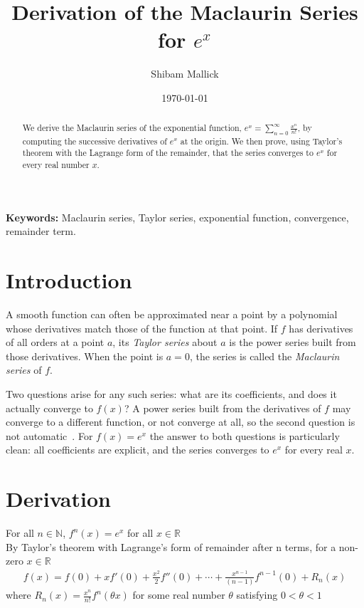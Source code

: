 \documentclass[12pt,a4paper]{article}
\title{Derivation of the Maclaurin Series for $e^x$}
\author{Shibam Mallick}
\date{\today}
\begin{document}
\maketitle

\begin{abstract}
     We derive the Maclaurin series of the exponential function, $e^x=\displaystyle{\sum_{n=0}^{\infty}\frac{x^n}{n!}}$, by computing the successive derivatives of $e^x$ at the origin. We then prove, using Taylor's theorem with the Lagrange form of the remainder, that the series converges to $e^x$ for every real number $x$.
\end{abstract}

\noindent\textbf{Keywords:}
Maclaurin series, Taylor series, exponential function, convergence, remainder term.

\section{Introduction}

A smooth function can often be approximated near a point by a polynomial whose derivatives match those of the function at that point. If $f$ has derivatives of all orders at a point $a$, its \emph{Taylor series} about $a$ is the power series built from those derivatives. When the point is $a=0$, the series is called the \emph{Maclaurin series} of $f$.
 
Two questions arise for any such series: what are its coefficients, and does it actually converge to $f(x)$? A power series built from the derivatives of $f$ may converge to a different function, or not converge at all, so the second question is not automatic~\cite{apostol,rudin}. For $f(x)=e^x$ the answer to both questions is particularly clean: all coefficients are explicit, and the series converges to $e^x$ for every real $x$.

\section{Derivation}

For all $n \in \mathbb{N}$, $f^n(x) = e^x$ for all $x \in \mathbb{R}$\\
By Taylor's theorem with Lagrange's form of remainder after n terms, for a non-zero $x \in \mathbb{R}$
\begin{align}
    f(x) = f(0) + xf'(0) + \frac{x^2}{2}f''(0) + \cdots + \frac{x^{n-1}}{(n-1)}f^{n-1}(0) + R_n(x) 
\end{align}
where $R_n(x) = \frac{x^n}{n!}f^n(\theta x)$ for some real number $\theta$ satisfying $0 <\theta <1 $ 
\end{document}
